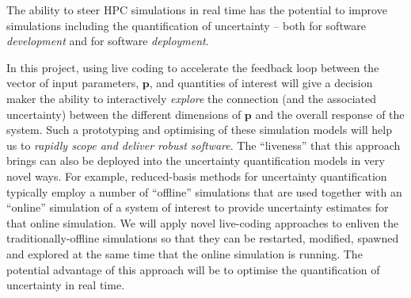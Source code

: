 The ability to steer HPC simulations in real time has
the potential to improve simulations including the quantification of 
uncertainty -- both for software {\em development} and for software {\em deployment}.
\iffalse
 There exist many algorithms (such as 
adaptive Markov chain Monte Carlo methods~\parencite{GilksEtal1994}) 
that attempt to choose the best samples based on the sampling
history. However, for complex problems a domain expert
may often have
a better idea about the region of the parameter space where function
evaluations should be concentrated. Through live programming within a
tight feedback loop a domain expert can incrementally guide the
current sampling strategy being used for uncertainty 
quantification, and, in turn, be guided by 
real time information derived from the reduced order model. 
The resulting strategies are expected to be
more aggressive in nature as they are better targeted to the specific
problem at hand. 
\fi
In this project, using live coding to accelerate the feedback loop between the vector of input parameters,
$\mathbf{p}$,  and quantities of in\-terest  will give a decision maker the ability to interactively
\emph{explore} the connection (and the associated uncertainty) between
the different dimensions of $\mathbf{p}$ and the overall response of
the system. Such a prototyping and optimising of these simulation models will help us to {\em rapidly scope and deliver 
robust software}. The ``liveness'' that this approach brings can also be deployed 
into the uncertainty quantification models in very novel ways. For example, reduced-basis methods for uncertainty 
quantification typically employ a number of ``offline'' simulations that are used together with an ``online'' simulation of 
a system of interest to provide uncertainty estimates for that online simulation. We will apply novel live-coding
approaches to enliven the traditionally-offline simulations so that they can be restarted, modified, spawned and 
explored at the same time that the online simulation is running. The potential advantage of this approach will be to 
optimise the quantification of uncertainty in real time. 



